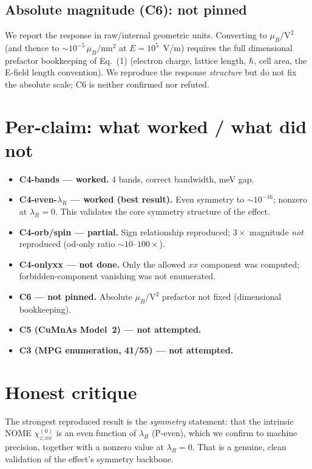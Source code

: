 \documentclass[11pt]{article}
\newcommand{\chizxx}{\chi^{(0)}_{z;xx}}
\newcommand{\lamR}{\lambda_{R}}
\newcommand{\muB}{\mu_{B}}
\begin{document}
\subsection{Absolute magnitude (C6): not pinned}
We report the response in raw/internal geometric units. Converting to
$\muB/\mathrm{V}^2$ (and thence to $\sim\!10^{-5}\,\muB/\mathrm{nm}^2$ at
$E=10^5$~V/m) requires the full dimensional prefactor bookkeeping of
Eq.~(1) (electron charge, lattice length, $\hbar$, cell area, the E-field
length convention). We reproduce the response \emph{structure} but do not
fix the absolute scale; C6 is neither confirmed nor refuted.

\section{Per-claim: what worked / what did not}
\begin{itemize}[leftmargin=1.4em]
\item \textbf{C4-bands --- worked.} 4 bands, correct bandwidth, meV gap.
\item \textbf{C4-even-$\lamR$ --- worked (best result).} Even symmetry to
$\sim\!10^{-16}$; nonzero at $\lamR=0$. This validates the core symmetry
structure of the effect.
\item \textbf{C4-orb/spin --- partial.} Sign relationship reproduced;
$3\times$ magnitude \emph{not} reproduced (od-only ratio $\sim\!10$--$100\times$).
\item \textbf{C4-onlyxx --- not done.} Only the allowed $xx$ component was
computed; forbidden-component vanishing was not enumerated.
\item \textbf{C6 --- not pinned.} Absolute $\muB/\mathrm{V}^2$ prefactor
not fixed (dimensional bookkeeping).
\item \textbf{C5 (CuMnAs Model~2) --- not attempted.}
\item \textbf{C3 (MPG enumeration, 41/55) --- not attempted.}
\end{itemize}

\section{Honest critique}
The strongest reproduced result is the \emph{symmetry} statement: that the
intrinsic NOME $\chizxx$ is an even function of $\lamR$ (P-even), which we
confirm to machine precision, together with a nonzero value at $\lamR=0$.
That is a genuine, clean validation of the effect's symmetry backbone.
\end{document}
